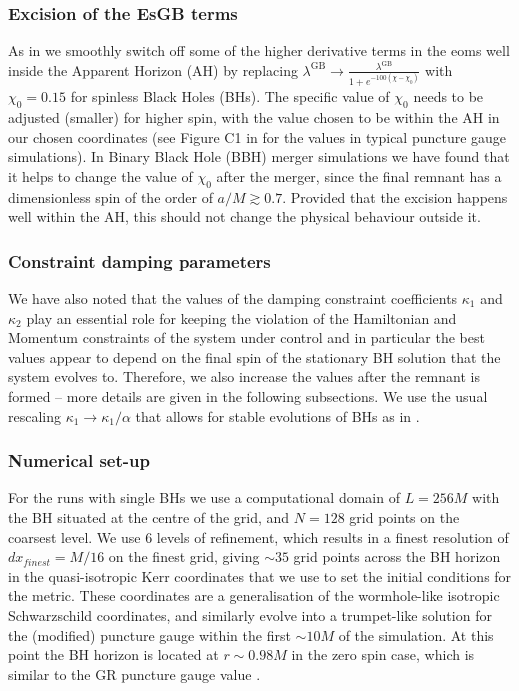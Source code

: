 \documentclass[reprint,aps,amsmath,amssymb,twoside,prd,showkeys,superscriptaddress,nofootinbib]{revtex4-2}
\begin{document}
\subsubsection{Excision of the EsGB terms}

As in \cite{AresteSalo:2022hua,Figueras:2020dzx,Figueras:2021abd} we smoothly switch off some of the higher derivative terms in the eoms well inside the Apparent Horizon (AH) by replacing $\lambda^{\text{GB}}\to\tfrac{\lambda^{\text{GB}}}{1+e^{-100(\chi-\chi_0)}}$ with $\chi_0=0.15$ for spinless Black Holes (BHs). The specific value of $\chi_0$ needs to be adjusted (smaller) for higher spin, with the value chosen to be within the AH in our chosen coordinates (see Figure C1 in \cite{Radia:2021smk} for the values in typical puncture gauge simulations). In Binary Black Hole (BBH) merger simulations we have found that it helps to change the value of $\chi_0$ after the merger, since the final remnant has a dimensionless spin of the order of $a/M\gtrsim 0.7$. Provided that the excision happens well within the AH, this should not change the physical behaviour outside it.

\subsubsection{Constraint damping parameters}

We have also noted that the values of the damping constraint coefficients $\kappa_1$ and $\kappa_2$ play an essential role for keeping the violation of the Hamiltonian and Momentum constraints of the system under control and in particular the best values appear to depend on the final spin of the stationary BH solution that the system evolves to. Therefore, we also increase the values after the remnant is formed -- more details are given in the following subsections. We use the usual rescaling   $\kappa_1\to\kappa_1/\alpha$ that allows for stable evolutions of BHs as in \cite{Alic:2013xsa}.

\subsubsection{Numerical set-up}

For the runs with single BHs we use a computational domain of $L = 256M$ with the BH situated at the centre of the grid, and $N=128$ grid points on the coarsest level. We use $6$ levels of refinement, which results in a finest resolution of $dx_{finest} = M/16$ on the finest grid, giving $\sim 35$ grid points across the BH horizon in the quasi-isotropic Kerr coordinates \cite{Liu:2009al} that we use to set the initial conditions for the metric.  These coordinates are a generalisation of the wormhole-like isotropic Schwarzschild coordinates, and similarly evolve into a trumpet-like solution for the (modified) puncture gauge within the first $\sim 10M$ of the simulation. At this point the BH horizon is located at $r\sim 0.98M$ in the zero spin case, which is similar to the GR puncture gauge value \cite{Radia:2021smk}.
\end{document}
